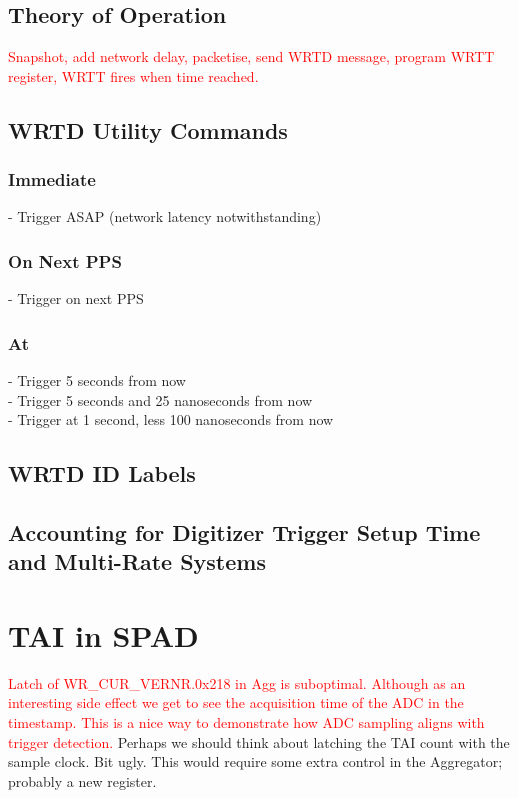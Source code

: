 \documentclass[]{article}
\begin{document}
\subsection{Theory of Operation}
\textcolor{red}{Snapshot, add network delay, packetise, send WRTD message, program WRTT register, WRTT fires when time reached.}

\subsection{WRTD Utility Commands}

\subsubsection{Immediate}
 - Trigger ASAP (network latency notwithstanding)
\subsubsection{On Next PPS}
 - Trigger on next PPS
\subsubsection{At}
 - Trigger 5 seconds from now\\
 - Trigger 5 seconds and 25 nanoseconds from now\\
 - Trigger at 1 second, less 100 nanoseconds from now



\subsection{WRTD ID Labels}
\subsection{Accounting for Digitizer Trigger Setup Time and Multi-Rate Systems}

\pagebreak
\section{TAI in SPAD}
\textcolor{red}{Latch of WR\_CUR\_VERNR.0x218 in Agg is suboptimal. Although as an interesting side effect we get to see the acquisition time of the ADC in the timestamp. This is a nice way to demonstrate how ADC sampling aligns with trigger detection.}
Perhaps we should think about latching the TAI count with the sample clock. Bit ugly. This would require some extra control in the Aggregator; probably a new register.\\
\end{document}
